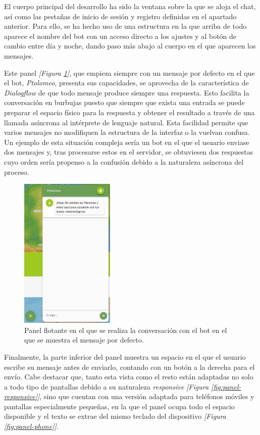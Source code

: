 \documentclass[11pt,spanish,listoffigures]{tfgetsinf}
\begin{document}
El cuerpo principal del desarrollo ha sido la ventana sobre la que se aloja el chat, así como las pestañas de inicio de sesión y registro definidas en el apartado anterior. Para ello, se ha hecho uso de una estructura en la que arriba de todo aparece el nombre del bot con un acceso directo a los ajustes y al botón de cambio entre día y noche, dando paso más abajo al cuerpo en el que aparecen los mensajes. 

Este panel \textit{[Figura \ref{fig:default-message}]}, que empieza siempre con un mensaje por defecto en el que el bot, \textit{Ptolomeo}, presenta sus capacidades, se aprovecha de la característica de \textit{Dialogflow} de que todo mensaje produce siempre una respuesta. Esto facilita la conversación en burbujas puesto que siempre que exista una entrada se puede preparar el espacio físico para la respuesta y obtener el resultado a través de una llamada asíncrona al intérprete de lenguaje natural. Esta facilidad permite que varios mensajes no modifiquen la estructura de la interfaz o la vuelvan confusa. Un ejemplo de esta situación compleja sería un bot en el que el usuario enviase dos mensajes y, tras procesarse estos en el servidor, se obtuviesen dos respuestas cuyo orden sería propenso a la confusión debido a la naturaleza asíncrona del proceso. 

\begin{figure}[h!]
    \centering
    \includegraphics[width=0.4\textwidth]{images/img16.png}
    \caption{Panel flotante en el que se realiza la conversación con el bot en el que se muestra el mensaje por defecto.}
    \label{fig:default-message}
\end{figure}

Finalmente, la parte inferior del panel muestra un espacio en el que el usuario escribe su mensaje antes de enviarlo, contando con un botón a la derecha para el envío. Cabe destacar que, tanto esta vista como el resto están adaptadas no solo a todo tipo de pantallas debido a su naturaleza \textit{responsive} \textit{[Figura \ref{fig:panel-responsive}]}, sino que cuentan con una versión adaptada para teléfonos móviles y pantallas especialmente pequeñas, en la que el panel ocupa todo el espacio disponible y el texto se extrae del mismo teclado del dispositivo \textit{[Figura \ref{fig:panel-phone}]}. 
\end{document}
